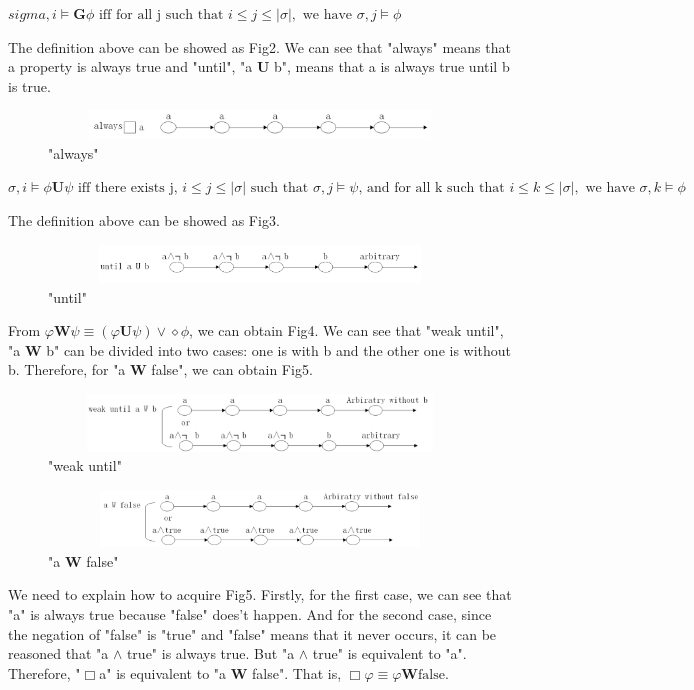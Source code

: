 \documentclass[10pt]{llncs}
\begin{document}
    \begin{definition}
        $sigma,i\models\textbf{G}\phi \text{ iff for all j such that }i\leq j\leq|\sigma|, \text{ we have } \sigma,j\models\phi$
    \end{definition}
    The definition above can be showed as Fig2. We can see that "always" means that a property is always true and "until", "a {\textbf U} b", means that a is always true until b is true.
    \begin{figure}[H]
      \centering
      \includegraphics[width=5.0in,height=0.3in]{3.png}
      \caption{"always"}
    \end{figure}
    \begin{definition}
    $\sigma,i\models\phi\textbf{U}\psi \text{ iff there exists j, }i\leq j\leq|\sigma| \text{ such that }\sigma,j\models\psi\text{, and for all k such that }i\leq k\leq|\sigma|,\text{ we have }\sigma,k\models\phi$
    \end{definition}
    The definition above can be showed as Fig3.
    \begin{figure}[H]
      \centering
      \includegraphics[width=5.0in,height=0.4in]{1.png}
      \caption{"until"}
    \end{figure}


    From $\varphi\textbf{W}\psi\equiv( \varphi\textbf{U}\psi)\vee\diamond\phi$, we can obtain Fig4. We can see that "weak until", "a \textbf{W} b" can be divided into two cases: one is with b and the other one is without b.
    Therefore, for "a \textbf{W} false", we can obtain Fig5.
    \begin{figure}[H]
      \centering
      \includegraphics[width=5.0in,height=0.6in]{4.png}
      \caption{"weak until"}
    \end{figure}
    \begin{figure}[H]
      \centering
      \includegraphics[width=5.0in,height=0.6in]{5.png}
      \caption{"a \textbf{W} false"}
    \end{figure}
      We need to explain how to acquire Fig5. Firstly, for the first case, we can see that "a" is always true because "false" does't happen. And for the second case, since the negation of "false" is "true" and "false" means that it never occurs, it can be reasoned that "a $\wedge$ true" is always true. But "a $\wedge$ true" is equivalent to "a". Therefore, "$\Box$a" is equivalent to "a \textbf{W} false". That is, $\Box\varphi\equiv \varphi\textbf{W}\text{false}$.
\end{document}
